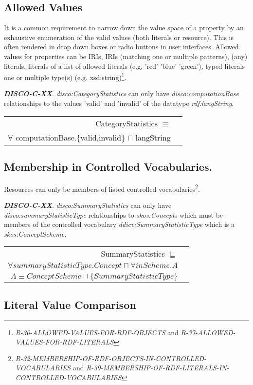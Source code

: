 \documentclass{llncs}
\newenvironment{DL}{
  \vspace{0cm}
  \begin{tabular}{r l}

}{
  \end{tabular}
}
\begin{document}
\subsection{Allowed Values}

It is a common requirement to narrow down the value space of a property by an exhaustive enumeration of the valid values (both literals or resource). 
This is often rendered in drop down boxes or radio buttons in user interfaces. 
Allowed values for properties can be IRIs, IRIs (matching one or multiple patterns), (any) literals, literals of a list of allowed literals (e.g. 'red' 'blue' 'green'), typed literals one or multiple type(s) (e.g. xsd:string)\footnote{{\em R-30-ALLOWED-VALUES-FOR-RDF-OBJECTS} and 
{\em R-37-ALLOWED-VALUES-FOR-RDF-LITERALS}}.

\textbf{{\em DISCO-C-XX}}.
{\em disco:CategoryStatistics} can only have {\em disco:computationBase} relationships to the values 'valid' and 'invalid' of the datatype {\em rdf:langString}.

\begin{DL}
CategoryStatistics $\equiv$ \\ $\forall$ computationBase.\{valid,invalid\} $\sqcap$ langString \\
\end{DL}

\subsection{Membership in Controlled Vocabularies.}

Resources can only be members of listed controlled vocabularies\footnote{{\em R-32-MEMBERSHIP-OF-RDF-OBJECTS-IN-CONTROLLED-VOCABULARIES} and
{\em R-39-MEMBERSHIP-OF-RDF-LITERALS-IN-CONTROLLED-VOCABULARIES}}.

\textbf{{\em DISCO-C-XX}}.
{\em disco:SummaryStatistics} can only have {\em disco:summaryStatisticType} relationships to {\em skos:Concept}s which must be members of the controlled vocabulary {\em ddicv:SummaryStatisticType} which is a {\em skos:ConceptScheme}.

\begin{DL}
SummaryStatistics $\sqsubseteq$ \\
$\forall summaryStatisticType.Concept \sqcap \forall inScheme . A$ \\
$A \equiv ConceptScheme \sqcap \{SummaryStatisticType\}$
\end{DL}

\subsection{Literal Value Comparison}
\end{document}
